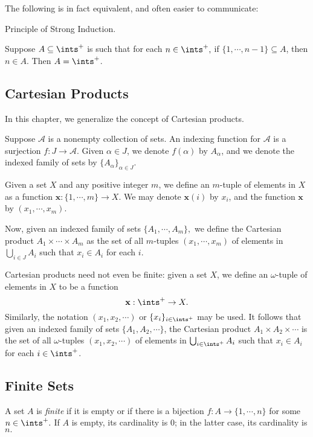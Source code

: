The following is in fact equivalent, and often easier to communicate:

\begin{theorem}\label{1.8}
    Principle of Strong Induction.
    \vspace{10pt}
    
    Suppose $A \subseteq \ints^+$ is such that for each $n \in \ints^+,$ if $\{1, \cdots, n-1\} \subseteq A$, then $n \in A$. Then $A = \ints^+$.
\end{theorem}

\subsection{Cartesian Products}
In this chapter, we generalize the concept of Cartesian products.

Suppose $\mathcal{A}$ is a nonempty collection of sets. An indexing function for $\mathcal{A}$ is a surjection $f: J \rightarrow \mathcal{A}$. Given $\alpha \in J$, we denote $f(\alpha)$ by $A_\alpha$, and we denote the indexed family of sets by $\{A_\alpha\}_{\alpha \in J}$.

Given a set $X$ and any positive integer $m$, we define an $m$-tuple of elements in $X$ as a function $\mathbf{x}: \{1, \cdots, m\} \rightarrow X$. We may denote $\mathbf{x}(i)$ by $x_i$, and the function $\mathbf{x}$ by $(x_1, \cdots, x_m)$.

Now, given an indexed family of sets $\{A_1, \cdots, A_m\},$ we define the Cartesian product $A_1 \times \cdots \times A_m$ as the set of all $m$-tuples $(x_1, \cdots, x_m)$ of elements in $\bigcup_{i \in J} A_i$ such that $x_i \in A_i$ for each $i$.

Cartesian products need not even be finite: given a set $X$, we define an $\omega$-tuple of elements in $X$ to be a function
$$\mathbf{x}: \ints^+ \rightarrow X.$$
Similarly, the notation $(x_1, x_2, \cdots)$ or $\{x_i\}_{i \in \ints^+}$ may be used. It follows that given an indexed family of sets $\{A_1, A_2, \cdots \}$, the Cartesian product $A_1 \times A_2 \times \cdots$ is the set of all $\omega$-tuples $(x_1, x_2, \cdots)$ of elements in $\bigcup_{i \in \ints^+} A_i$ such that $x_i \in A_i$ for each $i \in \ints^+$.

\subsection{Finite Sets}
A set $A$ is {\it finite} if it is empty or if there is a bijection $f: A \rightarrow \{1, \cdots, n\}$ for some $n \in \ints^+.$ If $A$ is empty, its cardinality is 0; in the latter case, its cardinality is $n.$

